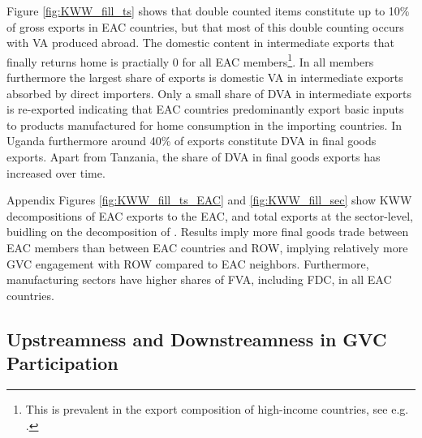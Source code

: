 \documentclass[a4paper]{article}
\begin{document}
Figure \ref{fig:KWW_fill_ts} shows that double counted items constitute up to 10\% of gross exports in EAC countries, but that most of this double counting occurs with VA produced abroad. The domestic content in intermediate exports that finally returns home is practially 0 for all EAC members\footnote{This is prevalent in the export composition of high-income countries, see e.g. \citep{Kummritz20162}.}. In all members furthermore the largest share of exports is domestic VA in intermediate exports absorbed by direct importers. Only a small share of DVA in intermediate exports is re-exported indicating that EAC countries predominantly export basic inputs to products manufactured for home consumption in the importing countries. In Uganda furthermore around 40\% of exports constitute DVA in final goods exports. Apart from Tanzania, the share of DVA in final goods exports has increased over time. \newline %


Appendix Figures \ref{fig:KWW_fill_ts_EAC} and \ref{fig:KWW_fill_sec} show KWW decompositions of EAC exports to the EAC, and total exports at the sector-level, buidling on the decomposition of \citet{wang2013quantifying}. Results imply more final goods trade between EAC members than between EAC countries and ROW, implying relatively more GVC engagement with ROW compared to EAC neighbors. Furthermore, manufacturing sectors have higher shares of FVA, including FDC, in all EAC countries. 



\subsection{Upstreamness and Downstreamness in GVC Participation}

\end{document}
